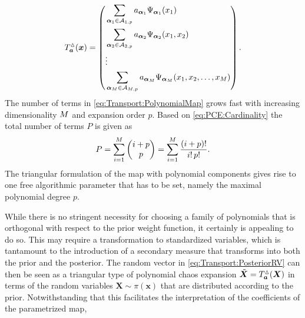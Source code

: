 \begin{equation} \label{eq:Transport:PolynomialMap}
  T_{\bm{a}}^\vartriangle(\bm{x})
  = \left(
    \begin{aligned}
      &\sum\limits_{\bm{\alpha}_1 \in \mathcal{A}_{1,p}} a_{\bm{\alpha}_1} \Psi_{\bm{\alpha}_1}(x_1) \\
      &\sum\limits_{\bm{\alpha}_2 \in \mathcal{A}_{2,p}} a_{\bm{\alpha}_2} \Psi_{\bm{\alpha}_2}(x_1,x_2) \\
      &\vdots \\
      &\sum\limits_{\bm{\alpha}_M \in \mathcal{A}_{M,p}} a_{\bm{\alpha}_M} \Psi_{\bm{\alpha}_M}(x_1,x_2,\ldots,x_M)
    \end{aligned}
    \right).
\end{equation}
The number of terms in \cref{eq:Transport:PolynomialMap} grows fast with increasing dimensionality \(M\) and expansion order \(p\).
Based on \cref{eq:PCE:Cardinality} the total number of terms \(P\) is given as
\begin{equation} \label{eq:Transport:Cardinality}
  P = \sum\limits_{i=1}^M \begin{pmatrix}
                                    i + p \\
                                    p \\
                                  \end{pmatrix}
  = \sum\limits_{i=1}^M \frac{(i + p)!}{i! \, p!}.
\end{equation}
The triangular formulation of the map with polynomial components gives rise to one free algorithmic parameter that has to be set, namely the maximal polynomial degree \(p\).
\par %
While there is no stringent necessity for choosing a family of polynomials that is orthogonal with respect to the prior weight function, it certainly is appealing to do so.
This may require a transformation to standardized variables, which is tantamount to the introduction of a secondary measure that transforms into both the prior and the posterior.
The random vector in \cref{eq:Transport:PosteriorRV} can then be seen as a triangular type of polynomial chaos expansion \(\tilde{\bm{X}} = T_{\bm{a}}^\vartriangle(\bm{X})\)
in terms of the random variables \(\bm{X} \sim \pi(\bm{x})\) that are distributed according to the prior.
Notwithstanding that this facilitates the interpretation of the coefficients of the parametrized map,
